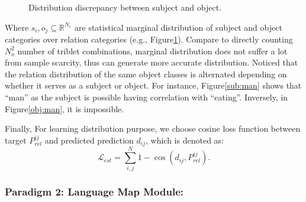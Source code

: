\documentclass[runningheads]{llncs}
\begin{document}
\begin{figure}[tbp!]
  \centering
  \begin{minipage}[t]{0.48\textwidth}
    \centering
    \qquad
  \end{minipage}
  \begin{minipage}[t]{0.48\textwidth}
    \centering
  \end{minipage}
  \caption{Distribution discrepancy between subject and object.}
  \label{fig:Distribution Discrepancy}
\end{figure}
Where $s_{i},o_{j}\subseteq\mathbb{R}^{N_{r}} $ are statistical  marginal
distribution  of subject and object categories over relation categories (e.g.,
Figure\ref{fig:Distribution Discrepancy}). Compare to directly counting
$N^{2}_{o}$ number of triblet combinations, marginal distribution does not
suffer a lot from sample scarcity, thus can generate more accurate
distribution. Noticed that the relation distribution of the same object classes
is alternated depending on whether it serves as a subject or object.
For instance, Figure\ref{sub:man} shows that ``man'' as the subject is possible
having correlation with ``eating''. Inversely, in Figure\ref{obj:man}, it is
impossible.

Finally,  For learning distribution purpose, we choose cosine loss function
between target $P_{rel}^{ij}$ and predicted prediction $d_{ij}$, which is
denoted as:
\begin{equation}
  \mathcal{L}_{est}=\sum_{i,j}^{N}1-\cos(d_{ij},P_{rel}^{ij}).
  \label{lossest}
\end{equation}



\subsubsection{Paradigm 2: Language Map  Module:}~\\
\end{document}
